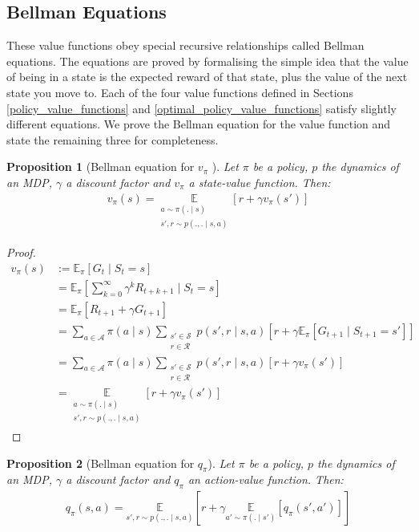 \documentclass[11pt, a4paper, bibliography=totoc]{report}
\newcommand{\E}[2]{\mathbb{E}_{#1} \left[ #2 \right] }
\newtheorem{proposition}{Proposition}
\begin{document}
\subsection{Bellman Equations}
These value functions obey special recursive relationships called Bellman equations. The equations are proved by formalising the simple idea that the value of being in a state is the expected reward of that state, plus the value of the next state you move to. Each of the four value functions defined in Sections \ref{policy_value_functions} and \ref{optimal_policy_value_functions} satisfy slightly different equations. We prove the Bellman equation for the value function and state the remaining three for completeness.

\begin{proposition}[Bellman equation for $ v_\pi $ {\cite[p.~59]{Sutton2018}}]
	Let $ \pi $ be a policy, $ p $ the dynamics of an MDP, $ \gamma $ a discount factor and $ v_\pi $ a state-value function. Then:
	\begin{align}
		v_\pi(s) = \underset{\substack{a \sim \pi(. \mid s) \\ s', r \sim p(., . \mid s, a) }}{\mathbb{E}} \left[ r + \gamma v_\pi(s') \right]
	\end{align}
\end{proposition}
\begin{proof}
	\begin{align*}
		v_\pi(s) &:= \E{\pi}{G_t \mid S_t = s} \\
		         &= \E{\pi}{\sum_{k=0}^{\infty} \gamma^k R_{t+k+1} \mid S_t = s} \\
		         &= \E{\pi}{R_{t+1} + \gamma G_{t+1}} \\
		         &= \sum_{a \in \mathcal{A}} \pi(a \mid s) \sum_{\substack{s' \in \mathcal{S} \\ r \in \mathcal{R}}} p(s', r \mid s, a) \left[ r + \gamma \E{\pi}{G_{t+1} \mid S_{t+1} = s'} \right] \\
		         &= \sum_{a \in \mathcal{A}} \pi(a \mid s) \sum_{\substack{s' \in \mathcal{S} \\ r \in \mathcal{R}}} p(s', r \mid s, a) \left[ r + \gamma  v_\pi(s') \right] \\
		         &= \underset{\substack{a \sim \pi(. \mid s) \\ s', r \sim p(., . \mid s, a) }}{\mathbb{E}} \left[ r + \gamma v_\pi(s') \right]
	\end{align*}
\end{proof}

\begin{proposition}[Bellman equation for $ q_\pi $]
	Let $ \pi $ be a policy, $ p $ the dynamics of an MDP, $ \gamma $ a discount factor and $ q_\pi $ an action-value function. Then:
	\begin{align}
	q_\pi(s, a) = \underset{s', r \sim p(., . \mid s, a)}{\mathbb{E}} \left[ r + \gamma \underset{a' \sim \pi(.\mid s')}{\mathbb{E}}\left[q_\pi(s', a')\right] \right]
	\end{align}
\end{proposition}
\end{document}
